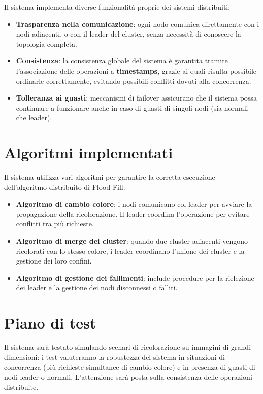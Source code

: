 \documentclass[12pt, a4paper]{report}
\begin{document}
Il sistema implementa diverse funzionalit\`a proprie dei sistemi distribuiti:
\begin{itemize}
    \item \textbf{Trasparenza nella comunicazione}: ogni nodo comunica direttamente con i nodi adiacenti, o con il leader del cluster, senza necessit\`a di conoscere la topologia completa.
    \item \textbf{Consistenza}: la consistenza globale del sistema \`e garantita tramite l'associazione delle operazioni a \textbf{timestamps}, grazie ai quali risulta possibile ordinarle correttamente, evitando possibili conflitti dovuti alla concorrenza.
    \item \textbf{Tolleranza ai guasti}: meccanismi di failover assicurano che il sistema possa continuare a funzionare anche in caso di guasti di singoli nodi (sia normali che leader).
\end{itemize}

\section{Algoritmi implementati}

Il sistema utilizza vari algoritmi per garantire la corretta esecuzione dell'algoritmo distribuito di Flood-Fill:
\begin{itemize}
    \item \textbf{Algoritmo di cambio colore}: i nodi comunicano col leader per avviare la propagazione della ricolorazione. Il leader coordina l'operazione per evitare conflitti tra pi\`u richieste.
    \item \textbf{Algoritmo di merge dei cluster}: quando due cluster adiacenti vengono ricolorati con lo stesso colore, i leader coordinano l'unione dei cluster e la gestione dei loro confini.
    \item \textbf{Algoritmo di gestione dei fallimenti}: include procedure per la rielezione dei leader e la gestione dei nodi disconnessi o falliti.
\end{itemize}

\section{Piano di test}

Il sistema sar\`a testato simulando scenari di ricolorazione su immagini di grandi dimensioni: i test valuteranno la robustezza del sistema in situazioni di concorrenza (pi\`u richieste simultanee di cambio colore) e in presenza di guasti di nodi leader o normali. L'attenzione sar\`a posta sulla consistenza delle operazioni distribuite.
\end{document}
